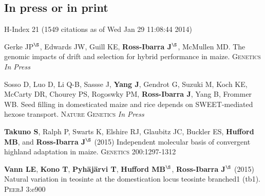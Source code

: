 \documentclass[letterpaper]{article}
\begin{document}
\subsection*{In press or in print} %
H-Index 21 {\small(1549 citations as of Wed Jan 29 11:08:44 2014)}
\begin{etaremune}

\item Gerke JP$^\S$, Edwards JW, Guill KE, {\bf Ross-Ibarra J}$^\S$, McMullen MD.  The genomic impacts of drift and selection for hybrid performance in maize. \textsc{Genetics} \emph{In Press}

\item Sosso D, Luo D, Li Q-B, Sassse J, {\bf Yang J}, Gendrot G, Suzuki M, Koch KE, McCarty DR, Chourey PS, Rogoswky PM, {\bf Ross-Ibarra J}, Yang B, Frommer WB. Seed filling in domesticated maize and rice depends on SWEET-mediated hexose transport. \textsc{Nature Genetics} \emph{In Press}

\item {\bf Takuno S}, Ralph P, Swarts K, Elshire RJ, Glaubitz JC, Buckler ES, {\bf Hufford MB}, and {\bf Ross-Ibarra J}$^\S$ (2015) Independent molecular basis of convergent highland adaptation in maize. \textsc{Genetics} 200:1297-1312

\item {\bf Vann LE}, {\bf Kono T}, {\bf Pyh\"aj\"arvi T}, {\bf Hufford MB}$^\S$, {\bf Ross-Ibarra J}$^\S$ (2015) Natural variation in teosinte at the domestication locus teosinte branched1 (tb1). \textsc{PeerJ} 3:e900


\end{etaremune}
\end{document}
